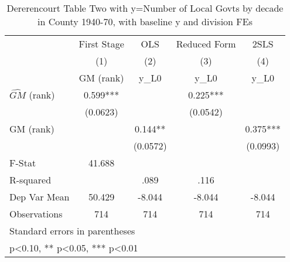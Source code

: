 \begin{table}[htbp]\centering
\def\sym#1{\ifmmode^{#1}\else\(^{#1}\)\fi}
\caption{Dererencourt Table Two with y=Number of Local Govts by decade in County 1940-70, with baseline y and division FEs}
\begin{tabular}{l*{4}{c}}
\toprule
                    & First Stage   &         OLS   &Reduced Form   &        2SLS   \\
                    &\multicolumn{1}{c}{(1)}&\multicolumn{1}{c}{(2)}&\multicolumn{1}{c}{(3)}&\multicolumn{1}{c}{(4)}\\
                    &\multicolumn{1}{c}{GM  (rank)}&\multicolumn{1}{c}{y\_L0}&\multicolumn{1}{c}{y\_L0}&\multicolumn{1}{c}{y\_L0}\\
\midrule
$\hat{GM}$ (rank)   &       0.599***&               &       0.225***&               \\
                    &    (0.0623)   &               &    (0.0542)   &               \\
\addlinespace
GM  (rank)          &               &       0.144** &               &       0.375***\\
                    &               &    (0.0572)   &               &    (0.0993)   \\
\midrule
F-Stat              &      41.688   &               &               &               \\
R-squared           &               &        .089   &        .116   &               \\
Dep Var Mean        &      50.429   &      -8.044   &      -8.044   &      -8.044   \\
Observations        &         714   &         714   &         714   &         714   \\
\bottomrule
\multicolumn{5}{l}{\footnotesize Standard errors in parentheses}\\
\multicolumn{5}{l}{\footnotesize * p<0.10, ** p<0.05, *** p<0.01}\\
\end{tabular}
\end{table}
